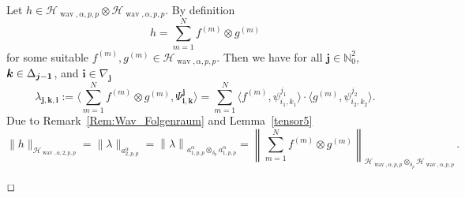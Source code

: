 \documentclass[12pt]{article}
\DeclareMathOperator{\wav}{wav}
\newenvironment{proof}{\begin{trivlist}
    \item[\hskip\labelsep{\it Proof.}]}{$\hfill\Box$\end{trivlist}}
\newcommand{\bsk}{\boldsymbol{k}}
\newcommand{\bsi}{\boldsymbol{i}}
\newcommand{\bsj}{\boldsymbol{j}}
\newcommand{\HH}{\mathcal{H}}
\newcommand{\N}{\mathbb{N}}
\newcommand{\beqq}{\begin{eqnarray*}}
\newcommand{\eeqq}{\end{eqnarray*}}
\begin{document}
\begin{proof}[Proof of Theorem~\ref{tensor17}]
Let $h\in \HH_{\wav,\alpha,p,p} \otimes \HH_{\wav,\alpha,p,p}$.
By definition 
\[
 h= \sum_{m=1}^N  f^{(m)} \otimes g^{(m)}   
\]
for some suitable $f^{(m)}, g^{(m)}\in \HH_{\wav,\alpha,p,p}$.
Then we have for all $\bsj \in \N^2_0$, $\bsk \in \Delta_{\bsj -{\bf 1}} $,  and $\bsi \in \nabla_{\bsj}$
\[
 \lambda_{\bsj,\bsk,\bsi} := 
 \Big\langle \sum_{m=1}^N f^{(m)} \otimes g^{(m)}, \Psi^{\bsj}_{\bsi,\bsk} \Big\rangle
=  \sum_{m=1}^N 
\langle f^{(m)}, \psi^{j_1}_{i_1,k_1} \rangle \cdot 
\langle g^{(m)}, \psi^{j_2}_{i_2,k_2} \rangle.
\]
Due to Remark~\ref{Rem:Wav_Folgenraum} and Lemma~\ref{tensor5}
\begin{equation*}
 \|h \|_{\HH_{\wav,\alpha,2,p,p}} = \|\lambda\|_{a^\alpha_{2,p,p}} 
  = \left\| \lambda  \right\|_{ a^\alpha_{1,p,p}  \otimes_{\delta_p} a^\alpha_{1,p,p} } 
=  \left\| \sum_{m=1}^N  f^{(m)} \otimes g^{(m)} \right\|_{ \HH_{\wav,\alpha,p,p} \otimes_{\delta_p}  \HH_{\wav,\alpha,p,p}}\,.
\end{equation*}

\end{proof}
\end{document}
